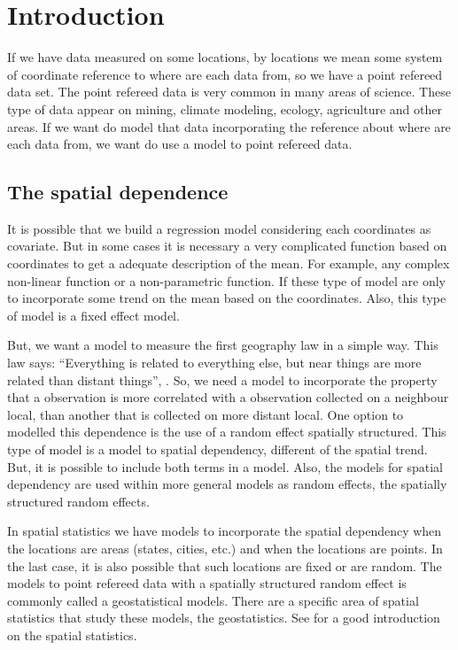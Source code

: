
\chapter{Introduction} 

If we have data measured on some locations, 
by locations we mean some system of coordinate 
reference to where are each data from, so we 
have a point refereed data set. 
The point refereed data is very common in many 
areas of science. These type of data appear on 
mining, climate modeling, ecology, agriculture 
and other areas. 
If we want do model that data incorporating 
the reference about where are each data from, 
we want do use a model to point refereed data. 

\section{The spatial dependence}

It is possible that we build a regression model 
considering each coordinates as covariate. 
But in some cases it is necessary a very 
complicated function based on coordinates to 
get a adequate description of the mean. 
For example, any complex non-linear function or 
a non-parametric function. 
If these type of model are only to incorporate 
some trend on the mean based on the coordinates. 
Also, this type of model is a fixed effect model. 

But, we want a model to measure the first geography 
law in a simple way. 
This law says: ``Everything is related to everything else, 
but near things are more related than distant things'', 
\cite{tobler:1970}. 
So, we need a model to incorporate the property that a 
observation is more correlated with a observation 
collected on a neighbour local, than another that 
is collected on more distant local. 
One option to modelled this dependence is the use 
of a random effect spatially structured. 
This type of model is a model to spatial dependency, 
different of the spatial trend. 
But, it is possible to include both terms in a model. 
Also, the models for spatial dependency are used 
within more general models as random effects, 
the spatially structured random effects. 

In spatial statistics we have models to incorporate the 
spatial dependency when the locations are areas 
(states, cities, etc.) and when the locations are points. 
In the last case, it is also possible that such 
locations are fixed or are random. 
The models to point refereed data with a spatially 
structured random effect is commonly called a 
geostatistical models. 
There are a specific area of spatial statistics 
that study these models, the geostatistics. 
See \cite{cressie:1993} for a good introduction on 
the spatial statistics. 

